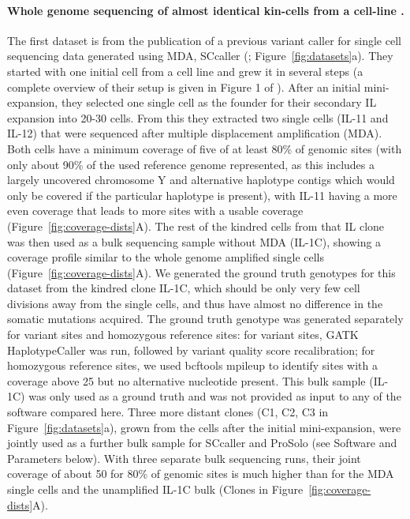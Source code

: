 \documentclass[authoryear,preprint,11pt]{scrartcl}
\begin{document}
\paragraph{Whole genome sequencing of almost identical kin-cells from a cell-line \citep{dong_accurate_2017}.}
The first dataset is from the publication of a previous variant caller for single cell sequencing data generated using MDA, SCcaller (\cite{dong_accurate_2017}; Figure~\ref{fig:datasets}a).
They started with one initial cell from a cell line and grew it in several steps (a complete overview of their setup is given in Figure 1 of \cite{dong_accurate_2017}).
After an initial mini-expansion, they selected one single cell as the founder for their secondary IL expansion into 20-30 cells.
From this they extracted two single cells (IL-11 and IL-12) that were sequenced after multiple displacement amplification (MDA).
Both cells have a minimum coverage of five of at least 80\% of genomic sites (with only about 90\% of the used reference genome represented, as this includes a largely uncovered chromosome Y and alternative haplotype contigs which would only be covered if the particular haplotype is present), with IL-11 having a more even coverage that leads to more sites with a usable coverage (Figure~\ref{fig:coverage-dists}A).
The rest of the kindred cells from that IL clone was then used as a bulk sequencing sample without MDA (IL-1C), showing a coverage profile similar to the whole genome amplified single cells (Figure~\ref{fig:coverage-dists}A).
We generated the ground truth genotypes for this dataset from the kindred clone IL-1C, which should be only very few cell divisions away from the single cells, and thus have almost no difference in the somatic mutations acquired.
The ground truth genotype was generated separately for variant sites and homozygous reference sites:
for variant sites, GATK HaplotypeCaller was run, followed by variant quality score recalibration; for homozygous reference sites, we used bcftools mpileup to identify sites with a coverage above 25 but no alternative nucleotide present.
This bulk sample (IL-1C) was only used as a ground truth and was not provided as input to any of the software compared here.
Three more distant clones (C1, C2, C3 in Figure~\ref{fig:datasets}a), grown from the cells after the initial mini-expansion, were jointly used as a further bulk sample for SCcaller and ProSolo (see Software and Parameters below).
With three separate bulk sequencing runs, their joint coverage of about 50 for 80\% of genomic sites is much higher than for the MDA single cells and the unamplified IL-1C bulk (Clones in Figure~\ref{fig:coverage-dists}A).\\
\end{document}
